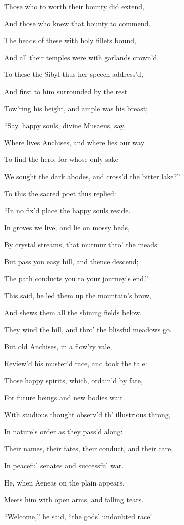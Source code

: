 Those who to worth their bounty did extend,

And those who knew that bounty to commend.

The heads of these with holy fillets bound,

And all their temples were with garlands crown’d.

To these the Sibyl thus her speech address’d,

And first to him surrounded by the rest

Tow’ring his height, and ample was his breast;

“Say, happy souls, divine Musaeus, say,

Where lives Anchises, and where lies our way

To find the hero, for whose only sake

We sought the dark abodes, and cross’d the bitter lake?”

To this the sacred poet thus replied:

“In no fix’d place the happy souls reside.

In groves we live, and lie on mossy beds,

By crystal streams, that murmur thro’ the meads:

But pass yon easy hill, and thence descend;

The path conducts you to your journey’s end.”

This said, he led them up the mountain’s brow,

And shews them all the shining fields below.

They wind the hill, and thro’ the blissful meadows go.

But old Anchises, in a flow’ry vale,

Review’d his muster’d race, and took the tale:

Those happy spirits, which, ordain’d by fate,

For future beings and new bodies wait.

With studious thought observ’d th’ illustrious throng,

In nature’s order as they pass’d along:

Their names, their fates, their conduct, and their care,

In peaceful senates and successful war.

He, when Aeneas on the plain appears,

Meets him with open arms, and falling tears.

“Welcome,” he said, “the gods’ undoubted race!

